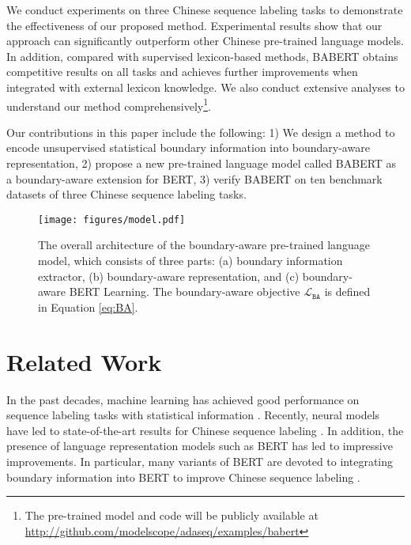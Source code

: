 \documentclass[11pt]{article}
\begin{document}
\begin{CJK}{UTF8}{gbsn}
We conduct experiments on three Chinese sequence labeling tasks to demonstrate the effectiveness of our proposed method.
Experimental results show that our approach can significantly outperform other Chinese pre-trained language models.
In addition, compared with supervised lexicon-based methods, BABERT obtains competitive results on all tasks and achieves further improvements when integrated with external lexicon knowledge.
We also conduct extensive analyses to understand our method comprehensively\footnote{The pre-trained model and code will be publicly available at \url{http://github.com/modelscope/adaseq/examples/babert}}.


Our contributions in this paper include the following:
1) We design a method to encode unsupervised statistical boundary information into boundary-aware representation,
2) propose a new pre-trained language model called BABERT as a boundary-aware extension for BERT,
3) verify BABERT on ten benchmark datasets of three Chinese sequence labeling tasks.

















\begin{figure*}
  \centering
  \texttt{[image: figures/model.pdf]}
  \caption{The overall architecture of the boundary-aware pre-trained language model, which consists of three parts:
  (a) boundary information extractor, (b) boundary-aware representation, and (c) boundary-aware BERT Learning. The boundary-aware objective $\mathcal{L}_\texttt{BA}$ is defined in Equation \ref{eq:BA}.
}
  \label{fig:model}
\end{figure*}


\section{Related Work}
In the past decades, machine learning has achieved good performance on sequence labeling tasks with statistical information \cite{bellegarda2004statistical, low2005maximum, bouma2009normalized}.
Recently, neural models have led to state-of-the-art results for Chinese sequence labeling \cite{lample-etal-2016-neural, ma-hovy-2016-end, TACL792}.
In addition, the presence of language representation models such as BERT \cite{devlin2018bert} has led to impressive improvements.
In particular, many variants of BERT are devoted to integrating boundary information into BERT to improve Chinese sequence labeling \cite{diao-etal-2020-zen,jia-etal-2020-entity,liu-etal-2021-lexicon}.


\end{CJK}
\end{document}
